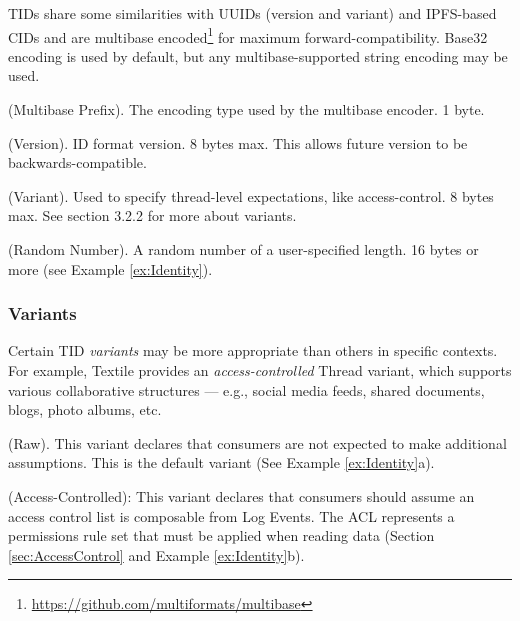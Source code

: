 \documentclass{textile}
\begin{document}
TIDs share some similarities with UUIDs \cite{leachUniversallyUniqueIDentifier2005} (version and variant) and IPFS-based CIDs and are multibase encoded\footnote{\url{https://github.com/multiformats/multibase}} for maximum forward-compatibility. Base32 encoding is used by default, but any multibase-supported string encoding may be used.

\begin{definition}
  (Multibase Prefix). The encoding type used by the multibase encoder. 1 byte.
\end{definition}

\begin{definition}
  (Version). ID format version. 8 bytes max. This allows future version to be backwards-compatible.
\end{definition}

\begin{definition}
  (Variant). Used to specify thread-level expectations, like access-control. 8 bytes max. See section 3.2.2 for more about variants.
\end{definition}

\begin{definition}
  (Random Number). A random number of a user-specified length. 16 bytes or more  (see Example \ref{ex:Identity}).
\end{definition}

\subsubsection{Variants}\label{sec:variants}

Certain TID \emph{variants} may be more appropriate than others in specific contexts. For example, Textile provides an \emph{access-controlled} Thread variant, which supports various collaborative structures --- e.g., social media feeds, shared documents, blogs, photo albums, etc.

\begin{definition}
  (Raw). This variant declares that consumers are not expected to make additional assumptions. This is the default variant (See Example \ref{ex:Identity}a).
\end{definition}

\begin{definition}
  (Access-Controlled): This variant declares that consumers should assume an access control list is composable from Log Events. The ACL represents a permissions rule set that must be applied when reading data (Section  \ref{sec:AccessControl} and Example \ref{ex:Identity}b).
\end{definition}
\end{document}
